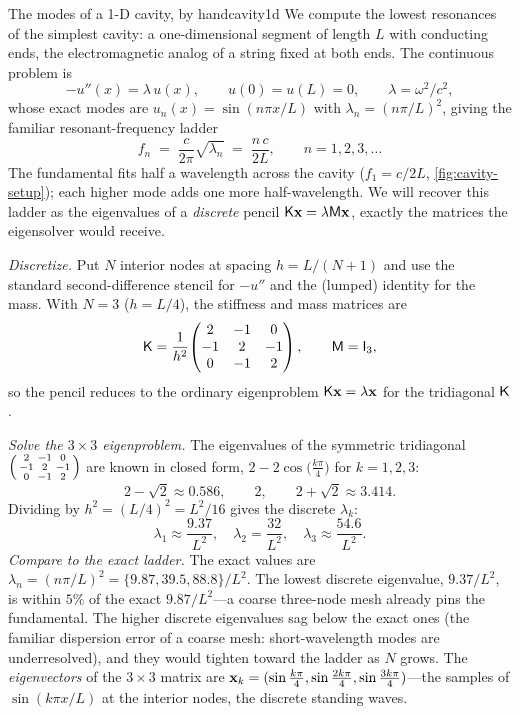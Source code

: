 \begin{workedexample}{The modes of a 1-D cavity, by hand}{cavity1d}
We compute the lowest resonances of the simplest cavity: a one-dimensional
segment of length $L$ with conducting ends, the electromagnetic analog of a
string fixed at both ends. The continuous problem is
\[
  -u''(x) = \lambda\, u(x), \qquad u(0)=u(L)=0, \qquad \lambda = \omega^2/c^2,
\]
whose exact modes are $u_n(x)=\sin(n\pi x/L)$ with $\lambda_n=(n\pi/L)^2$, giving
the familiar resonant-frequency ladder
\[
  f_n \;=\; \frac{c}{2\pi}\sqrt{\lambda_n} \;=\; \frac{n\,c}{2L},
  \qquad n=1,2,3,\dots
\]
The fundamental fits half a wavelength across the cavity ($f_1=c/2L$,
\cref{fig:cavity-setup}); each higher mode adds one more half-wavelength. We will
recover this ladder as the eigenvalues of a \emph{discrete} pencil
$\mathsf{K}\mathbf{x}=\lambda\mathsf{M}\mathbf{x}$, exactly the matrices the eigensolver would receive.

\emph{Discretize.} Put $N$ interior nodes at spacing $h=L/(N+1)$ and use the
standard second-difference stencil for $-u''$ and the (lumped) identity for the
mass. With $N=3$ ($h=L/4$), the stiffness and mass matrices are
\[
  \mathsf{K} = \frac{1}{h^2}\!\begin{pmatrix} 2 & -1 & 0\\ -1 & 2 & -1\\ 0 & -1 & 2\end{pmatrix},
  \qquad
  \mathsf{M} = \mathsf{I}_3,
\]
so the pencil reduces to the ordinary eigenproblem $\mathsf{K}\mathbf{x}=\lambda\mathbf{x}$ for the
tridiagonal $\mathsf{K}$.

\emph{Solve the $3\times3$ eigenproblem.} The eigenvalues of the symmetric
tridiagonal $\begin{psmallmatrix}2&-1&0\\-1&2&-1\\0&-1&2\end{psmallmatrix}$ are
known in closed form, $2-2\cos\!\bigl(\tfrac{k\pi}{4}\bigr)$ for $k=1,2,3$:
\[
  2-\sqrt2 \approx 0.586,\qquad 2,\qquad 2+\sqrt2 \approx 3.414.
\]
Dividing by $h^2=(L/4)^2=L^2/16$ gives the discrete $\lambda_k$:
\[
  \lambda_1 \approx \frac{9.37}{L^2},\quad
  \lambda_2 = \frac{32}{L^2},\quad
  \lambda_3 \approx \frac{54.6}{L^2}.
\]
\emph{Compare to the exact ladder.} The exact values are
$\lambda_n=(n\pi/L)^2 = \{9.87, 39.5, 88.8\}/L^2$. The lowest discrete eigenvalue,
$9.37/L^2$, is within $5\%$ of the exact $9.87/L^2$---a coarse three-node mesh
already pins the fundamental. The higher discrete eigenvalues sag below the exact
ones (the familiar dispersion error of a coarse mesh: short-wavelength modes are
underresolved), and they would tighten toward the ladder as $N$ grows. The
\emph{eigenvectors} of the $3\times3$ matrix are
$\mathbf{x}_k=(\sin\tfrac{k\pi}{4},\sin\tfrac{2k\pi}{4},\sin\tfrac{3k\pi}{4})$---the
samples of $\sin(k\pi x/L)$ at the interior nodes, the discrete standing waves.


\end{workedexample}

